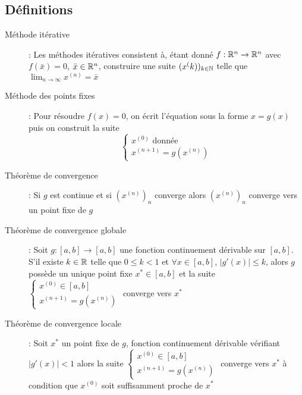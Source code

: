 \subsection{Définitions}
\begin{description}
\item[Méthode itérative] : Les méthodes itératives consistent à, étant donné $f:\mathbb{R}^n\rightarrow\mathbb{R}^n$ avec $f(\bar x)=0$, $\bar x\in\mathbb{R}^n$, construire une suite $(x^(k))_{k\in\mathbb{N}}$ telle que $\lim_{n\rightarrow\infty}x^{(n)}=\bar x$
\item[Méthode des points fixes] : Pour résoudre $f(x)=0$, on écrit l'équation sous la forme $x=g(x)$ puis on construit la suite
    \[
        \begin{cases}
            x^{(0)}\textrm{ donnée}\\
            x^{(n+1)}=g(x^{(n)})
        \end{cases}
    \]
\item[Théorème de convergence] : Si $g$ est continue et si $(x^{(n)})_n$ converge alors $(x^{(n)})_n$ converge vers un point fixe de $g$
\item[Théorème de convergence globale] : Soit $g:[a,b]\rightarrow [a,b]$ une fonction continuement dérivable sur $[a,b]$. S'il existe $k\in\mathbb{R}$ telle que 
    $0\le k<1$ et $\forall x\in [a,b]$, $|g'(x)|\le k$, alors $g$ possède un unique point fixe $x^*\in[a,b]$ et la suite
    $\begin{cases}
    x^{(0)}\in [a,b]\\
    x^{(n+1)}=g(x^{(n)})
    \end{cases}$
    converge vers $x^*$
\item[Théorème de convergence locale] : Soit $x^*$ un point fixe de $g$, fonction continuement dérivable vérifiant $|g'(x)|<1$ alors la suite
    $\begin{cases}
    x^{(0)}\in [a,b]\\
    x^{(n+1)}=g(x^{(n)})
    \end{cases}$
    converge vers $x^*$ à condition que $x^{(0)}$ soit suffisamment proche de $x^*$
\end{description}
